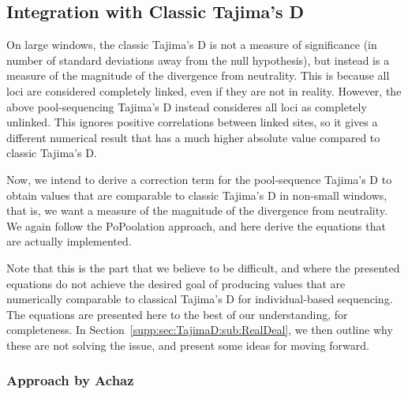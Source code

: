 \documentclass[letterpaper,fontsize=9pt,DIV=12]{scrartcl}
\newcounter{todo}
\newcommand\todo[1]{}
\newcommand\secref[1]{Section~\ref{#1}}
\begin{document}



\subsection{Integration with Classic Tajima's D}
\label{supp:sec:TajimaD:sub:Classic}

On large windows, the classic Tajima's D is not a measure of significance (in number of standard deviations away from the null hypothesis), but instead is a measure of the magnitude of the divergence from neutrality.  This is because all loci are considered completely linked, even if they are not in reality.  However, the above pool-sequencing Tajima's D instead consideres all loci as completely unlinked. This ignores positive correlations between linked sites, so it gives a different numerical result that has a much higher absolute value compared to classic Tajima's D.

Now, we intend to derive a correction term for the pool-sequence Tajima's D to obtain values that are comparable to classic Tajima's D in non-small windows, that is, we want a measure of the magnitude of the divergence from neutrality.
We again follow the PoPoolation approach, and here derive the equations that are actually implemented. 

Note that this is the part that we believe to be difficult, and where the presented equations do not achieve the desired goal of producing values that are numerically comparable to classical Tajima's D for individual-based sequencing.  The equations are presented here to the best of our understanding, for completeness. In \secref{supp:sec:TajimaD:sub:RealDeal}, we then outline why these are not solving the issue, and present some ideas for moving forward.


\subsubsection*{Approach by Achaz}
\end{document}
